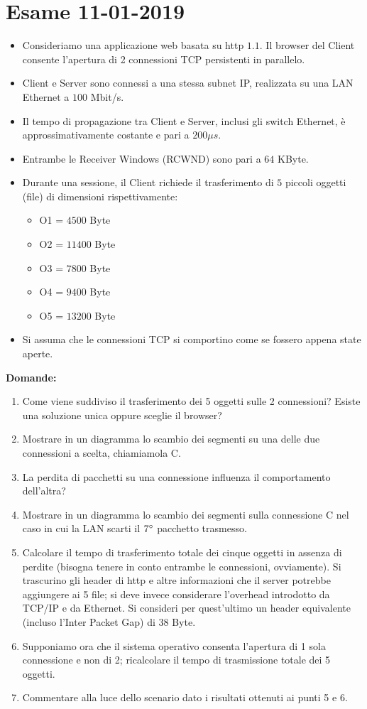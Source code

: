 \documentclass[10pt,a4paper]{article}
\begin{document}
	\section{Esame 11-01-2019}
	\begin{itemize}
		\item Consideriamo una applicazione web basata su http $1.1.$ Il browser del Client consente l'apertura di 2 connessioni TCP persistenti in parallelo. 
		\item Client e Server sono connessi a una stessa subnet IP, realizzata su una LAN Ethernet a $100$ Mbit/s. 
		\item Il tempo di propagazione tra Client e Server, inclusi gli switch Ethernet, è approssimativamente costante e pari a $200 \mu s$. 
		\item Entrambe le Receiver Windows (RCWND) sono pari a $64$ KByte.
		\item Durante una sessione, il Client richiede il trasferimento di $5$ piccoli oggetti (file) di dimensioni rispettivamente:
			\begin{itemize}
				\item O1 = $4500$ Byte
				\item O2 = $11400$ Byte
				\item O3 = $7800$ Byte
				\item O4 = $9400$ Byte
				\item O5 = $13200$ Byte
			\end{itemize}
		\item Si assuma che le connessioni TCP si comportino come se fossero appena state aperte.
	\end{itemize}
	\textbf{Domande:}
	\begin{enumerate}
		\item Come viene suddiviso il trasferimento dei 5 oggetti sulle 2 connessioni? Esiste una soluzione unica oppure sceglie il browser?
		\item Mostrare in un diagramma lo scambio dei segmenti su una delle due connessioni a scelta, chiamiamola C.
		\item La perdita di pacchetti su una connessione influenza il comportamento dell'altra?
		\item Mostrare in un diagramma lo scambio dei segmenti sulla connessione C nel caso in cui la LAN scarti il $7 \degree$ pacchetto trasmesso.
		\item Calcolare il tempo di trasferimento totale dei cinque oggetti in assenza di perdite (bisogna tenere in conto entrambe le connessioni, ovviamente). Si trascurino gli header di http e altre informazioni che il server potrebbe aggiungere ai 5 file; si deve invece considerare l'overhead introdotto da TCP/IP e da Ethernet. Si consideri per quest'ultimo un header 
		equivalente (incluso l'Inter Packet Gap) di $38$ Byte.
		\item Supponiamo ora che il sistema operativo consenta l'apertura di 1 sola connessione e non di 2; ricalcolare il tempo di trasmissione totale dei 5 oggetti.
		\item Commentare alla luce dello scenario dato i risultati ottenuti ai punti 5 e 6.
	\end{enumerate}
\end{document}
